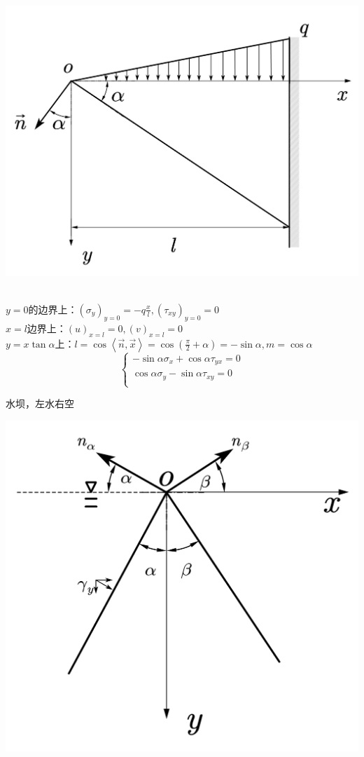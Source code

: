 	\centerline{\includegraphics[scale=0.4]{figure/2-2.png}}
\begin{remark}
	\quad\\
	$y=0$的边界上：$\left( \sigma _y \right) _{y=0}=-q\frac{x}{l},\left( \tau _{xy} \right) _{y=0}=0$\\
	$x=l$边界上：$\left( u \right) _{x=l}=0,\left( v \right) _{x=l}=0$\\
	$y=x\tan \alpha$上：$l=\cos \left< \vec{n},\vec{x} \right> =\cos \left( \frac{\pi}{2}+\alpha \right) =-\sin \alpha ,m=\cos \alpha $
	\[\begin{cases}
	-\sin \alpha \sigma _x+\cos \alpha \tau _{yx}=0\\
	\cos \alpha \sigma _y-\sin \alpha \tau _{xy}=0\\
	\end{cases}\]
\end{remark}
\begin{example}
		水坝，左水右空
\end{example}
\centerline{\includegraphics[scale=0.6]{figure/2-3.png}}


